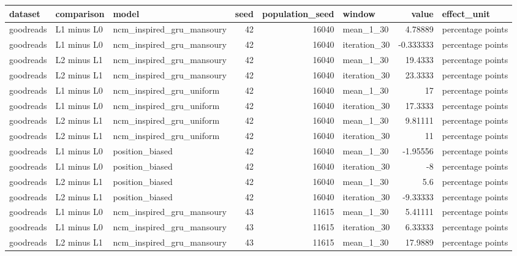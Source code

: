 \begin{table}[htbp!]
\centering
\small
\setlength{\tabcolsep}{3pt}
\renewcommand{\arraystretch}{1.1}
\begin{tabular}{lllrrlrl}
\hline
dataset & comparison & model & seed & population\_seed & window & value & effect\_unit \\
\hline
goodreads & L1 minus L0 & ncm\_inspired\_gru\_mansoury & 42 & 16040 & mean\_1\_30 & 4.78889 & percentage points \\
goodreads & L1 minus L0 & ncm\_inspired\_gru\_mansoury & 42 & 16040 & iteration\_30 & -0.333333 & percentage points \\
goodreads & L2 minus L1 & ncm\_inspired\_gru\_mansoury & 42 & 16040 & mean\_1\_30 & 19.4333 & percentage points \\
goodreads & L2 minus L1 & ncm\_inspired\_gru\_mansoury & 42 & 16040 & iteration\_30 & 23.3333 & percentage points \\
goodreads & L1 minus L0 & ncm\_inspired\_gru\_uniform & 42 & 16040 & mean\_1\_30 & 17 & percentage points \\
goodreads & L1 minus L0 & ncm\_inspired\_gru\_uniform & 42 & 16040 & iteration\_30 & 17.3333 & percentage points \\
goodreads & L2 minus L1 & ncm\_inspired\_gru\_uniform & 42 & 16040 & mean\_1\_30 & 9.81111 & percentage points \\
goodreads & L2 minus L1 & ncm\_inspired\_gru\_uniform & 42 & 16040 & iteration\_30 & 11 & percentage points \\
goodreads & L1 minus L0 & position\_biased & 42 & 16040 & mean\_1\_30 & -1.95556 & percentage points \\
goodreads & L1 minus L0 & position\_biased & 42 & 16040 & iteration\_30 & -8 & percentage points \\
goodreads & L2 minus L1 & position\_biased & 42 & 16040 & mean\_1\_30 & 5.6 & percentage points \\
goodreads & L2 minus L1 & position\_biased & 42 & 16040 & iteration\_30 & -9.33333 & percentage points \\
goodreads & L1 minus L0 & ncm\_inspired\_gru\_mansoury & 43 & 11615 & mean\_1\_30 & 5.41111 & percentage points \\
goodreads & L1 minus L0 & ncm\_inspired\_gru\_mansoury & 43 & 11615 & iteration\_30 & 6.33333 & percentage points \\
goodreads & L2 minus L1 & ncm\_inspired\_gru\_mansoury & 43 & 11615 & mean\_1\_30 & 17.9889 & percentage points \\

\end{tabular}
\end{table}

